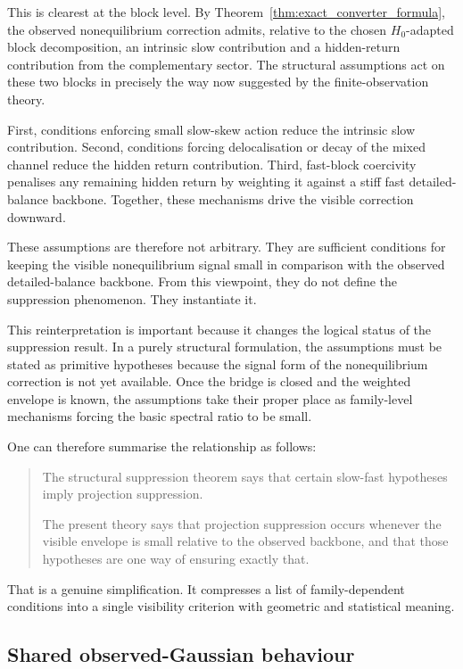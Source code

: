 \documentclass[11pt,a4paper]{article}
\numberwithin{equation}{section}
\theoremstyle{thmcompact}
\theoremstyle{remark}
\begin{document}
This is clearest at the block level. By Theorem~\ref{thm:exact_converter_formula}, the observed nonequilibrium correction admits, relative to the chosen \(H_0\)-adapted block decomposition, an intrinsic slow contribution and a hidden-return contribution from the complementary sector. The structural assumptions act on these two blocks in precisely the way now suggested by the finite-observation theory.

First, conditions enforcing small slow-skew action reduce the intrinsic slow contribution. Second, conditions forcing delocalisation or decay of the mixed channel reduce the hidden return contribution. Third, fast-block coercivity penalises any remaining hidden return by weighting it against a stiff fast detailed-balance backbone. Together, these mechanisms drive the visible correction downward.

These assumptions are therefore not arbitrary. They are sufficient conditions for keeping the visible nonequilibrium signal small in comparison with the observed detailed-balance backbone. From this viewpoint, they do not define the suppression phenomenon. They instantiate it.

This reinterpretation is important because it changes the logical status of the suppression result. In a purely structural formulation, the assumptions must be stated as primitive hypotheses because the signal form of the nonequilibrium correction is not yet available. Once the bridge is closed and the weighted envelope is known, the assumptions take their proper place as family-level mechanisms forcing the basic spectral ratio to be small.

One can therefore summarise the relationship as follows:

\begin{quote}
The structural suppression theorem says that certain slow-fast hypotheses imply projection suppression.

The present theory says that projection suppression occurs whenever the visible envelope is small relative to the observed backbone, and that those hypotheses are one way of ensuring exactly that.
\end{quote}

That is a genuine simplification. It compresses a list of family-dependent conditions into a single visibility criterion with geometric and statistical meaning.

\subsection{Shared observed-Gaussian behaviour}
\end{document}
